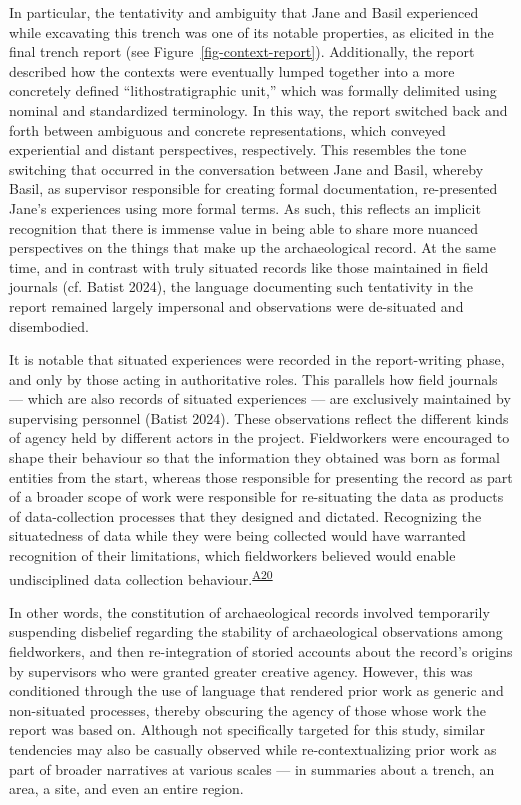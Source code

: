 \documentclass[
]{article}
\begin{document}
In particular, the tentativity and ambiguity that Jane and Basil
experienced while excavating this trench was one of its notable
properties, as elicited in the final trench report (see
Figure~\ref{fig-context-report}). Additionally, the report described how
the contexts were eventually lumped together into a more concretely
defined ``lithostratigraphic unit,'' which was formally delimited using
nominal and standardized terminology. In this way, the report switched
back and forth between ambiguous and concrete representations, which
conveyed experiential and distant perspectives, respectively. This
resembles the tone switching that occurred in the conversation between
Jane and Basil, whereby Basil, as supervisor responsible for creating
formal documentation, re-presented Jane's experiences using more formal
terms. As such, this reflects an implicit recognition that there is
immense value in being able to share more nuanced perspectives on the
things that make up the archaeological record. At the same time, and in
contrast with truly situated records like those maintained in field
journals (cf. Batist 2024), the language documenting such tentativity in
the report remained largely impersonal and observations were de-situated
and disembodied.

It is notable that situated experiences were recorded in the
report-writing phase, and only by those acting in authoritative roles.
This parallels how field journals --- which are also records of situated
experiences --- are exclusively maintained by supervising personnel
(Batist 2024). These observations reflect the different kinds of agency
held by different actors in the project. Fieldworkers were encouraged to
shape their behaviour so that the information they obtained was born as
formal entities from the start, whereas those responsible for presenting
the record as part of a broader scope of work were responsible for
re-situating the data as products of data-collection processes that they
designed and dictated. Recognizing the situatedness of data while they
were being collected would have warranted recognition of their
limitations, which fieldworkers believed would enable undisciplined data
collection behaviour.\textsuperscript{\hyperref[sec-A20]{A20}}

In other words, the constitution of archaeological records involved
temporarily suspending disbelief regarding the stability of
archaeological observations among fieldworkers, and then re-integration
of storied accounts about the record's origins by supervisors who were
granted greater creative agency. However, this was conditioned through
the use of language that rendered prior work as generic and non-situated
processes, thereby obscuring the agency of those whose work the report
was based on. Although not specifically targeted for this study, similar
tendencies may also be casually observed while re-contextualizing prior
work as part of broader narratives at various scales --- in summaries
about a trench, an area, a site, and even an entire region.
\end{document}
